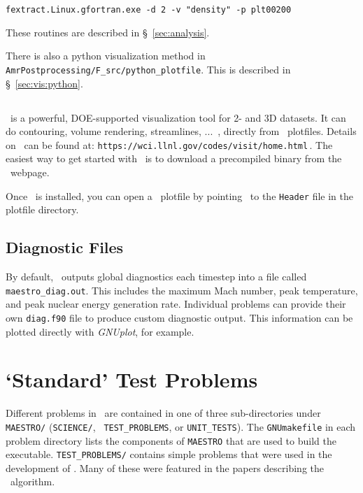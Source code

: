 \begin{verbatim}
fextract.Linux.gfortran.exe -d 2 -v "density" -p plt00200
\end{verbatim}

These routines are described in \S~\ref{sec:analysis}.

There is also a python visualization method in {\tt
AmrPostprocessing/F\_src/python\_plotfile}.  This is described
in \S~\ref{sec:vis:python}.


\subsection{\visit}

\visit\ is a powerful, DOE-supported visualization tool for 2- and 3D
datasets.  It can do contouring, volume rendering, streamlines, ...\, ,
directly from \boxlib\ plotfiles.   Details on
\visit\ can be found at:\newline
 {\tt https://wci.llnl.gov/codes/visit/home.html}\,. \newline
The easiest way to get started with \visit\ is to download a precompiled
binary from the \visit\ webpage.

Once \visit\ is installed, you can open a \boxlib\ plotfile by pointing
\visit\ to the {\tt Header} file in the plotfile directory.

\subsection{Diagnostic Files}

By default, \maestro\ outputs global diagnostics each timestep into a
file called {\tt maestro\_diag.out}.  This includes the maximum Mach
number, peak temperature, and peak nuclear energy generation rate.
Individual problems can provide their own {\tt diag.f90} file to
produce custom diagnostic output.  This information can be plotted
directly with {\sl GNUplot}, for example.





\section{`Standard' Test Problems}

Different problems in \maestro\ are contained in one of three
sub-directories under {\tt MAESTRO/} ({\tt SCIENCE/}, {\tt
TEST\_PROBLEMS}, or {\tt UNIT\_TESTS}).  The {\tt GNUmakefile} in each
problem directory lists the components of {\tt MAESTRO} that are used
to build the executable.  {\tt TEST\_PROBLEMS/} contains simple
problems that were used in the development of \maestro.  Many
of these were featured in the papers describing the \maestro\ algorithm.

